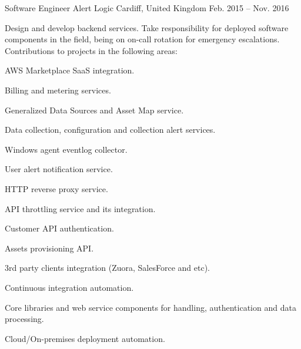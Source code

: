 \begin{cventries}
  \cventry
    {Software Engineer} %
    {Alert Logic} %
    {Cardiff, United Kingdom} %
    {Feb. 2015 -- Nov. 2016} %
    {
      \responsibilities
        {Design and develop backend services. Take responsibility for
        deployed software components in the field, being on on-call
        rotation for emergency escalations. Contributions to projects
        in the following areas:}
      \begin{cvitems} %
        \item {AWS Marketplace SaaS integration.}
        \item {Billing and metering services.}
        \item {Generalized Data Sources and Asset Map service.}
        \item {Data collection, configuration and collection alert services.}
        \item {Windows agent eventlog collector.}
        \item {User alert notification service.}
        \item {HTTP reverse proxy service.}
        \item {API throttling service and its integration.}
        \item {Customer API authentication.}
        \item {Assets provisioning API.}
        \item {3rd party clients integration (Zuora, SalesForce and etc).}
        \item {Continuous integration automation.}
        \item {Core libraries and web service components for handling, authentication and data processing.}
        \item {Cloud/On-premises deployment automation.}
      \end{cvitems}
    }


\end{cventries}
